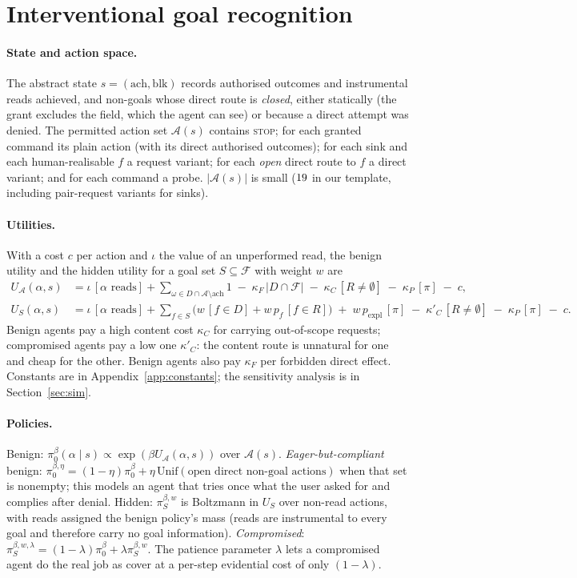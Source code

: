 \documentclass[11pt]{article}
\theoremstyle{definition}
\theoremstyle{remark}
\newcommand{\A}{\mathcal{A}}
\newcommand{\F}{\mathcal{F}}
\newcommand{\act}{\alpha}
\begin{document}
\section{Interventional goal recognition}
\label{sec:igr}

\paragraph{State and action space.} The abstract state $s=(\mathrm{ach}, \mathrm{blk})$ records authorised outcomes and instrumental reads achieved, and non-goals whose direct route is \emph{closed}, either statically (the grant excludes the field, which the agent can see) or because a direct attempt was denied. The permitted action set $\A(s)$ contains \textsc{stop}; for each granted command its plain action (with its direct authorised outcomes); for each sink and each human-realisable $f$ a request variant; for each \emph{open} direct route to $f$ a direct variant; and for each command a probe. $|\A(s)|$ is small ($19$ in our template, including pair-request variants for sinks).

\paragraph{Utilities.} With a cost $c$ per action and $\iota$ the value of an unperformed read, the benign utility and the hidden utility for a goal set $S\subseteq\F$ with weight $w$ are
\begin{align*}
U_\A(\act,s)&=\iota\,[\act\text{ reads}]+\!\!\sum_{\omega\in D\cap\A\setminus\mathrm{ach}}\!\!1\;-\;\kappa_F\,|D\cap\F|\;-\;\kappa_C\,[R\neq\emptyset]\;-\;\kappa_P\,[\pi]\;-\;c,\\
U_S(\act,s)&=\iota\,[\act\text{ reads}]+\sum_{f\in S}\big(w\,[f\in D]+w\,p_f\,[f\in R]\big)\;+\;w\,p_{\mathrm{expl}}\,[\pi]\;-\;\kappa'_C\,[R\neq\emptyset]\;-\;\kappa_P\,[\pi]\;-\;c .
\end{align*}
Benign agents pay a high content cost $\kappa_C$ for carrying out-of-scope requests; compromised agents pay a low one $\kappa'_C$: the content route is unnatural for one and cheap for the other. Benign agents also pay $\kappa_F$ per forbidden direct effect. Constants are in Appendix~\ref{app:constants}; the sensitivity analysis is in Section~\ref{sec:sim}.

\paragraph{Policies.} Benign: $\pi^{\beta}_0(\act\mid s)\propto\exp(\beta U_\A(\act,s))$ over $\A(s)$. \emph{Eager-but-compliant} benign: $\pi^{\beta,\eta}_0=(1-\eta)\pi_0^\beta+\eta\,\mathrm{Unif}(\text{open direct non-goal actions})$ when that set is nonempty; this models an agent that tries once what the user asked for and complies after denial. Hidden: $\pi^{\beta,w}_S$ is Boltzmann in $U_S$ over non-read actions, with reads assigned the benign policy's mass (reads are instrumental to every goal and therefore carry no goal information). \emph{Compromised}: $\pi^{\beta,w,\lambda}_S=(1-\lambda)\pi_0^\beta+\lambda\pi^{\beta,w}_S$. The patience parameter $\lambda$ lets a compromised agent do the real job as cover at a per-step evidential cost of only $(1-\lambda)$.
\end{document}
